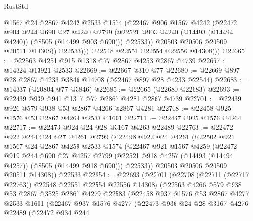 \begin{lexlean}{RustStd}
\begin{coremodule}
                    @1567
                    @24
                    @2867
                    @4242
                    @2533
                    @1574
                    (@22467
                      @906
                      @1567
                      @4242
                      (@22472
                        @904
                        @244
                        @690
                        @27
                        @4240
                        @2799
                        (@22521 @903 @4240 (@14493 (@14494 @4240)) (@8505 (@14499 @903 @690)))
                        @22533))
                    @20503
                    @20506
                    @20509
                    @20511
                    @14308))
                @22533)))
          @22548
          @22551
          @22554
          @22556
          @14308)))
@22665 := @22563 @4251 @915 @1318 @77 @2867 @4253 @2867 @4739
@22667 := @14324 @13921 @2533
@22669 := @22667 @310 @77
@22680 := @22669 @897 @28 @2867 @4233 @3846 @14708 (@22467 @897 @28 @4233 @22544)
@22683 := @14337 (@20804 @77 @3846)
@22685 := @22665 (@22680 @22683)
@22693 := @22439 @939 @941 @1317 @77 @2867 @4281 @2867 @4739
@22701 := @22439 @926 @579 @938 @53 @2867 @4266 @2867 @4281
@22708 := @22458 @925 @1576 @53 @2867 @4264 @2533 @1601
@22711 := @22467 @925 @1576 @4264
@22717 := @22473 @924 @24 @28 @3167 @4263 @22489
@22763 := @22472
    @922
    @244
    @24
    @27
    @4261
    @2799
    (@22498
      @922
      @24
      @4261
      (@22502
        @921
        @1567
        @24
        @2867
        @4259
        @2533
        @1574
        (@22467
          @921
          @1567
          @4259
          (@22472
            @919
            @244
            @690
            @27
            @4257
            @2799
            (@22521 @918 @4257 (@14493 (@14494 @4257)) (@8505 (@14499 @918 @690)))
            @22533))
        @20503
        @20506
        @20509
        @20511
        @14308))
    @22533
@22854 := @22693
    (@22701
      (@22708 (@22711 (@22717 @22763)) @22548 @22551 @22554 @22556 @14308)
      (@22563
        @4266
        @579
        @938
        @53
        @2867
        @3525
        @2867
        @4279
        @22583
        (@22458
          @937
          @1576
          @53
          @2867
          @4277
          @2533
          @1601
          (@22467
            @937
            @1576
            @4277
            (@22473
              @936
              @24
              @28
              @3167
              @4276
              @22489
              (@22472
                @934
                @244

\end{coremodule}
\end{lexlean}

